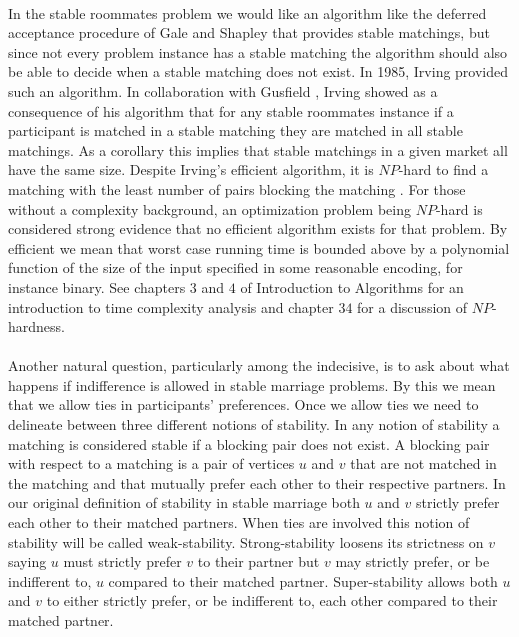 \paragraph{}
In the stable roommates problem we would like an algorithm like the deferred acceptance procedure of Gale and Shapley that provides stable matchings, but since not every problem instance has a stable matching the algorithm should also be able to decide when a stable matching does not exist. In 1985, Irving \cite{irving1985efficient} provided such an algorithm. In collaboration with Gusfield \cite{irving1987efficient}, Irving showed as a consequence of his algorithm that for any stable roommates instance if a participant is matched in a stable matching they are matched in all stable matchings. As a corollary this implies that stable matchings in a given market all have the same size. Despite Irving's efficient algorithm, it is $NP$-hard to find a matching with the least number of pairs blocking the matching \cite{abraham2005almost}. For those without a complexity background, an optimization problem being $NP$-hard is considered strong evidence that no efficient algorithm exists for that problem. By efficient we mean that worst case running time is bounded above by a polynomial function of the size of the input specified in some reasonable encoding, for instance binary. See chapters $3$ and $4$ of Introduction to Algorithms \cite{cormen2009introduction} for an introduction to time complexity analysis and chapter $34$ for a discussion of $NP$-hardness.
\paragraph{}
Another natural question, particularly among the indecisive, is to ask about what happens if indifference is allowed in stable marriage problems. By this we mean that we allow ties in participants' preferences. Once we allow ties we need to delineate between three different notions of stability. In any notion of stability a matching is considered stable if a blocking pair does not exist. A blocking pair with respect to a matching is a pair of vertices $u$ and $v$ that are not matched in the matching and that mutually prefer each other to their respective partners. In our original definition of stability in stable marriage both $u$ and $v$ strictly prefer each other to their matched partners. When ties are involved this notion of stability will be called weak-stability. Strong-stability loosens its strictness on $v$ saying $u$ must strictly prefer $v$ to their partner but $v$ may strictly prefer, or be indifferent to, $u$ compared to their matched partner. Super-stability allows both $u$ and $v$ to either strictly prefer, or be indifferent to, each other compared to their matched partner.
